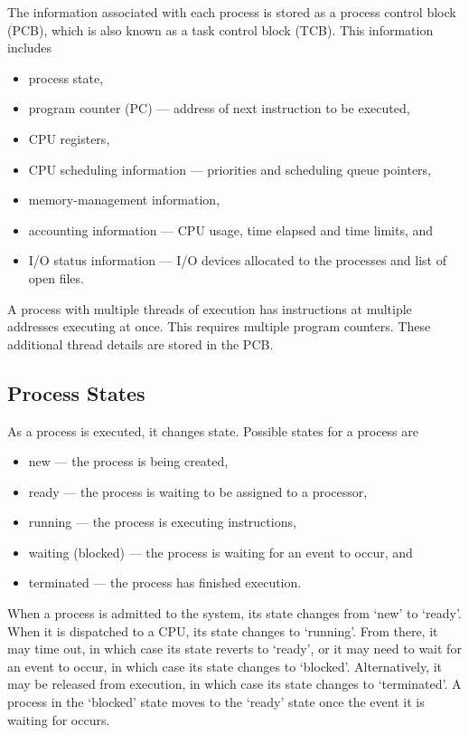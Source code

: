 The information associated with each process is stored as a process control block (PCB), which is also known as a task control block (TCB).
This information includes
\begin{itemize}
  \item process state,
  \item program counter (PC) --- address of next instruction to be executed,
  \item CPU registers,
  \item CPU scheduling information --- priorities and scheduling queue pointers,
  \item memory-management information,
  \item accounting information --- CPU usage, time elapsed and time limits, and
  \item I/O status information --- I/O devices allocated to the processes and list of open files.
\end{itemize}

A process with multiple threads of execution has instructions at multiple addresses executing at once.
This requires multiple program counters.
These additional thread details are stored in the PCB.

\subsection{Process States}

As a process is executed, it changes state.
Possible states for a process are
\begin{itemize}
  \item new --- the process is being created,
  \item ready --- the process is waiting to be assigned to a processor,
  \item running --- the process is executing instructions,
  \item waiting (blocked) --- the process is waiting for an event to occur, and
  \item terminated --- the process has finished execution.
\end{itemize}

When a process is admitted to the system, its state changes from `new' to `ready'.
When it is dispatched to a CPU, its state changes to `running'.
From there, it may time out, in which case its state reverts to `ready', or it may need to wait for an event to occur, in which case its state changes to `blocked'.
Alternatively, it may be released from execution, in which case its state changes to `terminated'.
A process in the `blocked' state moves to the `ready' state once the event it is waiting for occurs.

